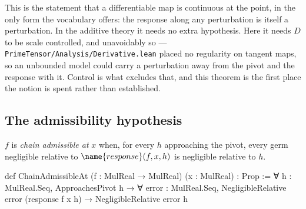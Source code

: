 \begin{remark}
\label{Analysis:Chain:rem:diff-cont}
This is the statement that a differentiable map is continuous at the point, in
the only form the vocabulary offers: the response along any perturbation is
itself a perturbation.  In the additive theory it needs no extra hypothesis.
Here it needs $D$ to be scale controlled, and unavoidably so ---
\texttt{PrimeTensor/Analysis/Derivative.lean} placed no regularity on tangent
maps, so an unbounded model could carry a perturbation away from the pivot and
the response with it.  Control is what excludes that, and this theorem is the
first place the notion is spent rather than established.
\end{remark}

\subsection{The admissibility hypothesis}

\begin{definition}\label{Analysis:Chain:def:admissible}
$f$ is \emph{chain admissible at} $x$ when, for every $h$ approaching the
pivot, every germ negligible relative to $\name{response}(f,x,h)$ is negligible
relative to $h$.
\end{definition}

\begin{leancode}
def ChainAdmissibleAt
    (f : MulReal → MulReal) (x : MulReal) : Prop :=
  ∀ h : MulReal.Seq,
    ApproachesPivot h →
    ∀ error : MulReal.Seq,
      NegligibleRelative error (response f x h) →
      NegligibleRelative error h
\end{leancode}

